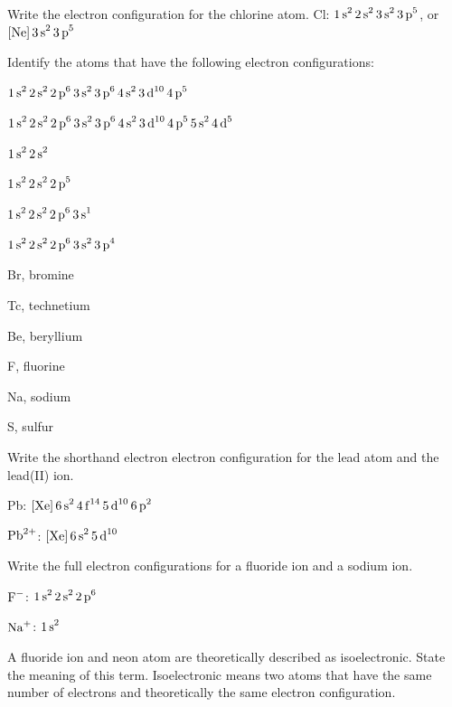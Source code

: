 \begin{sample}{Write the electron configuration for the chlorine atom.}
    Cl: $\ch{1s^2 2s^2 3s^2 3p^5}$, or $\ch{[Ne] 3s^2 3p^5}$
\end{sample}

\begin{sample}{Identify the atoms that have the following electron configurations:
        \begin{enum-alph}
            \item $\ch{1s^2 2s^2 2p^6 3s^2 3p^6 4s^2 3d^10 4p^5}$
            \item $\ch{1s^2 2s^2 2p^6 3s^2 3p^6 4s^2 3d^10 4p^5 5s^2 4d^5}$
            \item $\ch{1s^2 2s^2}$
            \item $\ch{1s^2 2s^2 2p^5}$
            \item $\ch{1s^2 2s^2 2p^6 3s^1}$
            \item $\ch{1s^2 2s^2 2p^6 3s^2 3p^4}$
        \end{enum-alph}
    }
    \begin{enum-alph}
        \item Br, bromine
        \item Tc, technetium
        \item Be, beryllium
        \item F, fluorine
        \item Na, sodium
        \item S, sulfur
    \end{enum-alph}
\end{sample}

\begin{sample}{Write the shorthand electron electron configuration for the lead atom and
    the lead(II) ion.}

    Pb: $\ch{[Xe] 6s^2 4f^14 5d^10 6p^2}$

    $\ch{Pb^{2+}}$: $\ch{[Xe] 6s^2 5d^10}$
\end{sample}

\begin{sample}{Write the full electron configurations for a fluoride ion and a sodium ion.}

    $\ch{F^-}$: $\ch{1s^2 2s^2 2p^6}$

    $\ch{Na^+}$: $\ch{1s^2}$
\end{sample}

\begin{sample}{A fluoride ion and neon atom are theoretically described as isoelectronic. State
    the meaning of this term.}
    Isoelectronic means two atoms that have the same number of electrons and theoretically the
    same electron configuration.
\end{sample}


